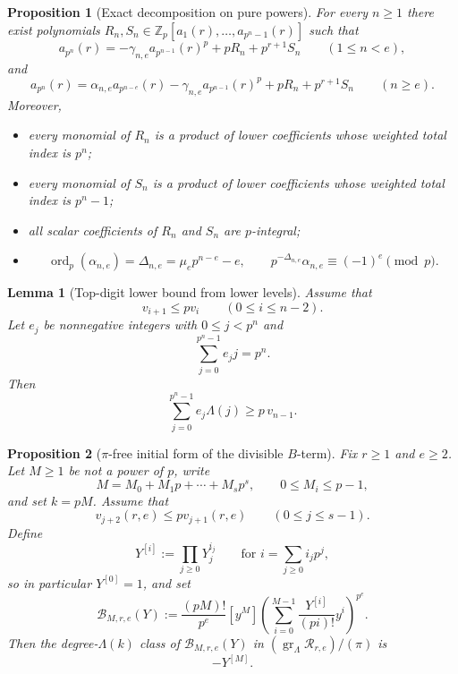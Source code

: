 \documentclass[10pt,a4paper]{amsart}
\newtheorem{lemma}{Lemma}
\newtheorem{proposition}{Proposition}
\newcommand{\Zp}{\mathbb{Z}_p}
\newcommand{\gr}{\operatorname{gr}}
\DeclareMathOperator{\ordop}{ord}
\newcommand{\vp}{\ordop_p}
\begin{document}
\begin{proposition}[Exact decomposition on pure powers]\label{prop:pure-decomp}
For every $n\ge1$ there exist polynomials $R_n,S_n\in\Zp[a_1(r),\ldots,a_{p^n-1}(r)]$ such that
\begin{equation}\label{eq:pure-decomp-small}
        a_{p^n}(r)=-\gamma_{n,e}a_{p^{n-1}}(r)^p+pR_n+p^{r+1}S_n
        \qquad(1\le n<e),
\end{equation}
and
\begin{equation}\label{eq:pure-decomp-large}
        a_{p^n}(r)=\alpha_{n,e}a_{p^{n-e}}(r)-\gamma_{n,e}a_{p^{n-1}}(r)^p+pR_n+p^{r+1}S_n
        \qquad(n\ge e).
\end{equation}
Moreover,
\begin{itemize}[leftmargin=2em]
\item every monomial of $R_n$ is a product of lower coefficients whose weighted total index is $p^n$;
\item every monomial of $S_n$ is a product of lower coefficients whose weighted total index is $p^n-1$;
\item all scalar coefficients of $R_n$ and $S_n$ are $p$-integral;
\item
\[
        \vp(\alpha_{n,e})=\Delta_{n,e}=\mu_ep^{n-e}-e,
        \qquad
        p^{-\Delta_{n,e}}\alpha_{n,e}\equiv(-1)^e\pmod p.
\]
\end{itemize}
\end{proposition}

\begin{lemma}[Top-digit lower bound from lower levels]\label{lem:top-digit-lower-pe}
Assume that
\[
        v_{i+1}\le p v_i\qquad (0\le i\le n-2).
\]
Let $e_j$ be nonnegative integers with $0\le j<p^n$ and
\[
        \sum_{j=0}^{p^n-1}e_jj=p^n.
\]
Then
\[
        \sum_{j=0}^{p^n-1}e_j\Lambda(j)\ge p\,v_{n-1}.
\]
\end{lemma}

\begin{proposition}[$\pi$-free initial form of the divisible $B$-term]\label{prop:initial-form-B-pe}
Fix $r\ge1$ and $e\ge2$.  Let $M\ge1$ be not a power of $p$, write
\[
        M=M_0+M_1p+\cdots+M_sp^s,
        \qquad
        0\le M_i\le p-1,
\]
and set $k=pM$.  Assume that
\[
        v_{j+2}(r,e)\le pv_{j+1}(r,e)
        \qquad (0\le j\le s-1).
\]
Define
\[
        Y^{[i]}:=\prod_{j\ge0}Y_j^{i_j}
        \qquad\text{for }i=\sum_{j\ge0} i_jp^j,
\]
so in particular $Y^{[0]}=1$, and set
\[
        \mathcal B_{M,r,e}(Y):=\frac{(pM)!}{p^e}[y^M]
        \left(\sum_{i=0}^{M-1}\frac{Y^{[i]}}{(pi)!}y^i\right)^{p^e}.
\]
Then the degree-$\Lambda(k)$ class of $\mathcal B_{M,r,e}(Y)$ in
$(\gr_\Lambda\mathcal R_{r,e})/(\pi)$ is
\[
        -Y^{[M]}.
\]
\end{proposition}
\end{document}

